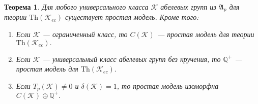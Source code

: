 \documentclass[14pt]{extarticle} %
\newtheorem{theorem}{Теорема}[section]
\def\A{{\mathfrak{A}}}
\def\K{{\mathcal{K}}}
\def\Q{{\mathbb{Q}}}
\def\Th{{\mathrm{Th}}}
\begin{document}
\begin{theorem}
Для любого универсального класса $\K$ абелевых групп из $\A_p$ для теории $\Th(\K_{ec})$ существует простая модель. Кроме того:
\begin{enumerate}
\item Если $\K$ --- ограниченный класс, то $C(\K)$ --- простая модель для теории $\Th(\K_{ec}).$
\item Если $\K$ --- универсальный класс абелевых групп без кручения, то $\Q^+$ --- простая модель для $\Th(\K_{ec}).$
\item Если $T_p(\K) \neq 0$ и $\delta(\K) = 1$, то простая модель изоморфна $C(\K) \oplus \Q^+.$
\end{enumerate}
\end{theorem}




\end{document}
